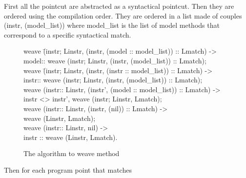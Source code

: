
First all the pointcut are abstracted as a syntactical pointcut. Then they are ordered using the compilation
order.
They are ordered in a list made of couples (instr, (model\_list)) where model\_list is the list of model methods 
that correspond to a specific syntactical match.

%
\begin{figure}
\bcode
weave \=(instr; Linstr, (instr, (model :: model\_list)) :: Lmatch) -> \\
\>model:: weave (instr; Linstr, (instr, (model\_list)) :: Lmatch);\\
weave \=(instr; Linstr, (instr, (instr :: model\_list)) :: Lmatch) -> \\
\>instr:: weave (instr; Linstr, (instr, (model\_list)) :: Lmatch);\\
weave (instr:: Linstr, (instr', (model :: model\_list)) :: Lmatch) -> \\
\>instr <> instr',  weave (instr; Linstr, Lmatch);\\
weave (instr:: Linstr, (instr, (nil)) :: Lmatch) -> \\
\>weave (Linstr, Lmatch);\\
weave (instr:: Linstr, nil) -> \\
\>instr :: weave (Linstr, Lmatch).
\ecode
\caption{The algorithm to weave method}
\label{weaving_algo}
\end{figure}
Then for each program point that matches
